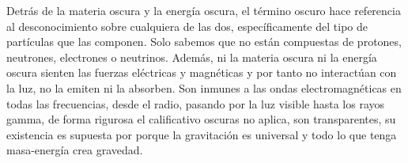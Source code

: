 %


Detrás de la materia oscura y la energía oscura, el término oscuro hace referencia al desconocimiento sobre cualquiera de las dos, específicamente del tipo de partículas que las componen. Solo sabemos que no están compuestas de protones, neutrones, electrones o neutrinos. Además, ni la materia oscura ni la energía oscura sienten las fuerzas eléctricas y magnéticas y por tanto no interactúan con la luz, no la emiten ni la absorben. Son inmunes a las ondas electromagnéticas en todas las frecuencias, desde el radio, pasando por la luz visible hasta los rayos gamma, de forma rigurosa el calificativo oscuras no aplica, son transparentes, su existencia es supuesta por porque la gravitación es universal y todo lo que tenga masa-energía crea gravedad.